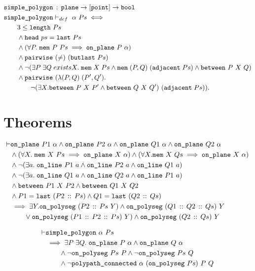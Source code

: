 \begin{align*}
  &\texttt{simple\_polygon}\,:\,\texttt{plane} \rightarrow [\texttt{point}] \rightarrow \texttt{bool}\\
  &\texttt{simple\_polygon}\vdash_{def}\ \alpha\ Ps \iff \\
  &\qquad 3 \leq \texttt{length}\ Ps\\
  &\qquad\wedge \texttt{head}\ ps = \texttt{last}\ Ps\\
  &\qquad\wedge (\forall P.\;\texttt{mem}\ P\ Ps \implies \texttt{on\_plane}\ P\ \alpha)\\
  &\qquad\wedge \texttt{pairwise}\ (\neq)\ (\texttt{butlast}\ Ps)\\
  &\qquad\wedge \neg(\exists P\;\exists Q\;exists X.\; \texttt{mem}\;X\;Ps\wedge\texttt{mem}\;(P,Q)\;(\texttt{adjacent}\;Ps)\wedge\texttt{between}\ P\ X\ Q)\\
  &\qquad\wedge \texttt{pairwise}\ (\lambda(P,Q)\;(P',Q').\\
  &\qquad\qquad\neg(\exists X. \texttt{between}\ P\ X\ P' \wedge \texttt{between}\ Q\ X\ Q')\ (\texttt{adjacent}\;Ps)).
\end{align*}

\section{Theorems}
\begin{align*}
\vdash &\code{on\_plane}\ P1\ \alpha \wedge \code{on\_plane}\ P2\ \alpha \wedge \code{on\_plane}\ Q1\ \alpha \wedge \code{on\_plane}\ Q2\ \alpha\\
       &\wedge(\forall X.\;\code{mem}\ X\ Ps \implies \code{on\_plane}\ X\ \alpha) \wedge (\forall X. \code{mem}\ X\ Qs \implies \code{on\_plane}\ X\ \alpha)\\
       &\wedge\Triangle{a}{P1}{P2}{Q1}\\
       &\wedge\Triangle{a}{Q1}{Q2}{P1}\\
       &\wedge\code{between}\ P1\ X\ P2 \wedge \code{between}\ Q1\ X\ Q2\\
       &\wedge P1 = \code{last}\ (\cons{P2}{Ps}) \wedge Q1 = \code{last}\ (\cons{Q2}{Qs})\\
       &\implies \exists Y. \code{on\_polyseg}\ (\cons{P2}{Ps}\ Y) \wedge \code{on\_polyseg}\ (\cons{Q1}{\cons{Q2}{Qs}})\ Y\\
       &\qquad\vee \code{on\_polyseg}\ (\cons{P1}{\cons{P2}{Ps}})\ Y) \wedge \code{on\_polyseg}\ (\cons{Q2}{Qs})\ Y
\end{align*}

\begin{align*}
\vdash &\code{simple\_polygon}\ \alpha\ Ps\\
       &\implies \exists P\;\exists Q.\; \code{on\_plane}\ P\ \alpha \wedge \code{on\_plane}\ Q\ \alpha\\
       &\qquad\wedge \neg\code{on\_polyseg}\ Ps\ P \wedge \neg\code{on\_polyseg}\ Ps\ Q\\
       &\qquad\wedge \neg\code{polypath\_connected}\ \alpha\ (\code{on\_polyseg}\ Ps)\ P\ Q
\end{align*}

